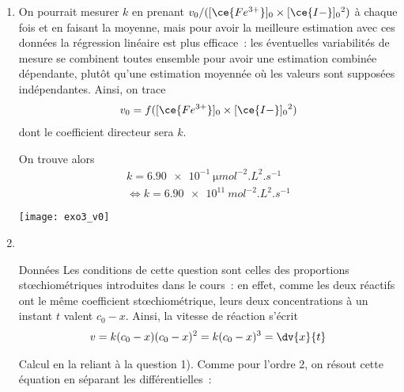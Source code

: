 \documentclass[a4paper, 12pt, final, garamond]{book}
\begin{document}
\begin{enumerate}
    \item On pourrait mesurer $k$ en prenant $v_0/([\ce{Fe^{3+}}]_{0}{}\times
        [\ce{I-}]_0{}^2)$ à chaque fois et en faisant la moyenne, mais pour
        avoir la meilleure estimation avec ces données la régression linéaire
        est plus efficace~: les éventuelles variabilités de mesure se combinent
        toutes ensemble pour avoir une estimation combinée dépendante, plutôt
        qu'une estimation moyennée où les valeurs sont supposées indépendantes.
        Ainsi, on trace
        \begin{gather*}
            v_0 = f([\ce{Fe^{3+}}]_{0}{}\times [\ce{I-}]_0{}^2)
        \end{gather*}
        dont le coefficient directeur sera $k$.

        \begin{minipage}{0.45\linewidth}
            On trouve alors
            \begin{gather*}
                k = \SI{6.90e-1}{\micro mol^{-2}.L^2.s^{-1}}\\
                \Leftrightarrow
                \boxed{
                k = \SI{6.90e11}{mol^{-2}.L^2.s^{-1}}}
            \end{gather*}
        \end{minipage}
        \hfill
        \begin{minipage}{0.55\linewidth}
            \begin{center}
                \texttt{[image: exo3\_v0]}
            \end{center}
        \end{minipage}
    \item~
        \begin{rdefi}{Données}
            Les conditions de cette question sont celles des proportions
            stœchiométriques introduites dans le cours~: en effet, comme les deux
            réactifs ont le même coefficient stœchiométrique, leurs deux
            concentrations à un instant $t$ valent $c_0 -x$. Ainsi, la vitesse de
            réaction s'écrit
            \begin{gather*}
                v = k (c_0 - x)(c_0-x)^2 = k(c_0-x)^3 = \dv{x}{t}
            \end{gather*}
        \end{rdefi}
        \begin{rexem}{Calcul}
            en la reliant à la question 1). Comme pour l'ordre 2, on résout cette
            équation en séparant les différentielles~:

\end{rexem}
\end{enumerate}
\end{document}
